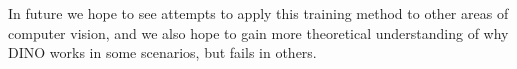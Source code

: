 \documentclass{article}
\begin{document}
In future we hope to see attempts to apply this training method to other areas of computer vision, and we also hope to gain more theoretical understanding of why DINO works in some scenarios, but fails in others. 









\let\thefootnote\relax{}

\nocite{*}


\end{document}
